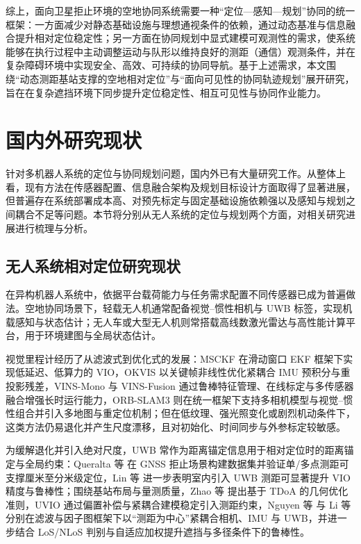 综上，面向卫星拒止环境的空地协同系统需要一种“定位—感知—规划”协同的统一框架：一方面减少对静态基础设施与理想通视条件的依赖，通过动态基准与信息融合提升相对定位稳定性；另一方面在协同规划中显式建模可观测性的需求，使系统能够在执行过程中主动调整运动与队形以维持良好的测距（通信）观测条件，并在复杂障碍环境中实现安全、高效、可持续的协同导航。基于上述需求，本文围绕“动态测距基站支撑的空地相对定位”与“面向可见性的协同轨迹规划”展开研究，旨在在复杂遮挡环境下同步提升定位稳定性、相互可见性与协同作业能力。

\section{国内外研究现状}

针对多机器人系统的定位与协同规划问题，国内外已有大量研究工作。从整体上看，现有方法在传感器配置、信息融合架构及规划目标设计方面取得了显著进展，但普遍存在系统部署成本高、对预先标定与固定基础设施依赖强以及感知与规划之间耦合不足等问题。本节将分别从无人系统的定位与规划两个方面，对相关研究进展进行梳理与分析。

\subsection{无人系统相对定位研究现状}

在异构机器人系统中，依据平台载荷能力与任务需求配置不同传感器已成为普遍做法。空地协同场景下，轻载无人机通常配备视觉–惯性相机与 UWB 标签，实现机载感知与状态估计；无人车或大型无人机则常搭载高线数激光雷达与高性能计算平台，用于环境建图与全局状态估计\cite{zhang2014loam,xu2021fastlio,xu2022fastlio2,chang2022lamp2,cramariuc2022maplab2}。

视觉里程计经历了从滤波式到优化式的发展：MSCKF\cite{mourikis2007msckf} 在滑动窗口 EKF 框架下实现低延迟、低算力的 VIO，OKVIS\cite{leutenegger2015okvis} 以关键帧非线性优化紧耦合 IMU 预积分与重投影残差，VINS-Mono\cite{qin2018vins} 与 VINS-Fusion\cite{qin2019vinsfusion} 通过鲁棒特征管理、在线标定与多传感器融合增强长时运行能力，ORB-SLAM3\cite{campos2021orbslam3} 则在统一框架下支持多相机模型与视觉–惯性组合并引入多地图与重定位机制；但在低纹理、强光照变化或剧烈机动条件下，这类方法仍易退化并产生尺度漂移，且对初始化、时间同步与外参标定较敏感。

为缓解退化并引入绝对尺度，UWB 常作为距离锚定信息用于相对定位时的距离锚定与全局约束\cite{uwbsurvey,queralta2020uwb,lin2023gnssuwb}：Queralta 等\cite{queralta2020uwb} 在 GNSS 拒止场景构建数据集并验证单/多点测距可支撑厘米至分米级定位，Lin 等\cite{lin2023gnssuwb} 进一步表明室内引入 UWB 测距可显著提升 VIO 精度与鲁棒性；围绕基站布局与量测质量，Zhao 等\cite{zhao2022finding} 提出基于 TDoA 的几何优化准则，UVIO\cite{delama2023uvio} 通过偏置补偿与紧耦合建模稳定引入测距约束，Nguyen 等\cite{nguyen2021range} 与 Li 等\cite{li2024uwbvio_fg} 分别在滤波与因子图框架下以“测距为中心”紧耦合相机、IMU 与 UWB，并进一步结合 LoS/NLoS 判别与自适应加权提升遮挡与多径条件下的鲁棒性\cite{jiang2024visionuwb,li2024uvioakf}。

